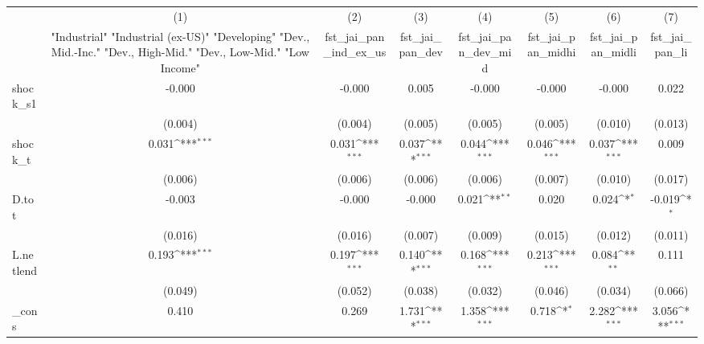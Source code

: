 {
\def\sym#1{\ifmmode^{#1}\else\(^{#1}\)\fi}
\begin{tabular}{l*{7}{c}}
\toprule
            &\multicolumn{1}{c}{(1)}&\multicolumn{1}{c}{(2)}&\multicolumn{1}{c}{(3)}&\multicolumn{1}{c}{(4)}&\multicolumn{1}{c}{(5)}&\multicolumn{1}{c}{(6)}&\multicolumn{1}{c}{(7)}\\
            &\multicolumn{1}{c}{ "Industrial" "Industrial (ex-US)" "Developing" "Dev., Mid.-Inc." "Dev., High-Mid."  "Dev., Low-Mid." "Low Income" }&\multicolumn{1}{c}{fst\_jai\_pan\_ind\_ex\_us}&\multicolumn{1}{c}{fst\_jai\_pan\_dev}&\multicolumn{1}{c}{fst\_jai\_pan\_dev\_mid}&\multicolumn{1}{c}{fst\_jai\_pan\_midhi}&\multicolumn{1}{c}{fst\_jai\_pan\_midli}&\multicolumn{1}{c}{fst\_jai\_pan\_li}\\
\midrule
shock\_s1    &      -0.000         &      -0.000         &       0.005         &      -0.000         &      -0.000         &      -0.000         &       0.022         \\
            &     (0.004)         &     (0.004)         &     (0.005)         &     (0.005)         &     (0.005)         &     (0.010)         &     (0.013)         \\
\addlinespace
shock\_t     &       0.031\sym{***}&       0.031\sym{***}&       0.037\sym{***}&       0.044\sym{***}&       0.046\sym{***}&       0.037\sym{***}&       0.009         \\
            &     (0.006)         &     (0.006)         &     (0.006)         &     (0.006)         &     (0.007)         &     (0.010)         &     (0.017)         \\
\addlinespace
D.tot       &      -0.003         &      -0.000         &      -0.000         &       0.021\sym{**} &       0.020         &       0.024\sym{*}  &      -0.019\sym{*}  \\
            &     (0.016)         &     (0.016)         &     (0.007)         &     (0.009)         &     (0.015)         &     (0.012)         &     (0.011)         \\
\addlinespace
L.netlend   &       0.193\sym{***}&       0.197\sym{***}&       0.140\sym{***}&       0.168\sym{***}&       0.213\sym{***}&       0.084\sym{**} &       0.111         \\
            &     (0.049)         &     (0.052)         &     (0.038)         &     (0.032)         &     (0.046)         &     (0.034)         &     (0.066)         \\
\addlinespace
\_cons      &       0.410         &       0.269         &       1.731\sym{***}&       1.358\sym{***}&       0.718\sym{*}  &       2.282\sym{***}&       3.056\sym{***}\\

\end{tabular}}
